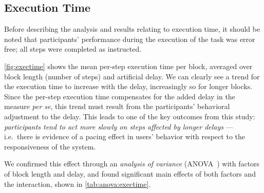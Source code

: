 \subsection{Execution Time}


Before describing the analysis and results relating to execution time, it should be noted that participants' performance during the execution of the task was error free; all steps were completed as instructed. 

\cref{fig:exectime} shows the mean per-step execution time per block, averaged over block length (number of steps) and artificial delay.
We can clearly see a trend for the execution time to increase with the delay, increasingly so for longer blocks. 
Since the per-step execution time  compensates for the added delay in the measure \emph{per se}, this trend must result from the participants' behavioral adjustment to the delay.
This leads to one of the key outcomes from this study: 
\emph{participants tend to act more slowly on steps affected by longer delays} --- i.e.\ there is evidence of a pacing effect in users' behavior with respect to the responsiveness of the system.

We confirmed this effect through an \emph{analysis of variance} (ANOVA~\cite{FUJIKOSHI1993ANOVA}) with factors of block length and delay, and found significant main effects of both factors and the interaction, shown in \cref{tab:anova:exectime}.

